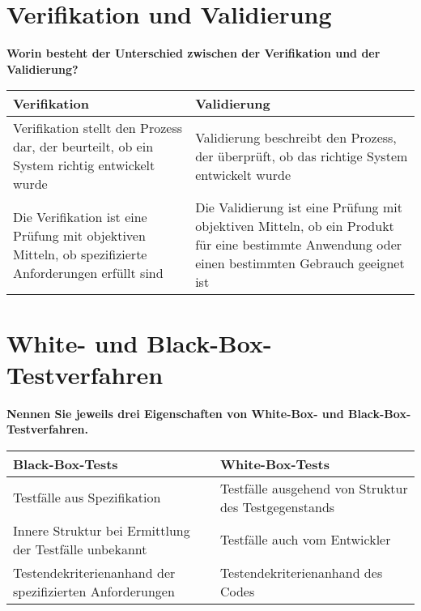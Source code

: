 \section{Verifikation und Validierung}
\textbf{Worin besteht der Unterschied zwischen der Verifikation und der Validierung?}
\begin{table}[H]
    \centering
    \begin{tabular}{p{.45\linewidth}p{.45\linewidth}}
        \toprule
        Verifikation                                                                                          & Validierung                                                                                                                                      \\
        \midrule
        Verifikation stellt den Prozess dar, der beurteilt, ob ein System richtig entwickelt wurde            & Validierung beschreibt den Prozess, der überprüft, ob das richtige System entwickelt wurde                                                       \\
        Die Verifikation ist eine Prüfung mit objektiven Mitteln, ob spezifizierte Anforderungen erfüllt sind & Die Validierung ist eine Prüfung mit objektiven Mitteln, ob ein Produkt für eine bestimmte Anwendung oder einen bestimmten Gebrauch geeignet ist \\
        \bottomrule
    \end{tabular}
\end{table}

\section{White- und Black-Box-Testverfahren}
\textbf{Nennen Sie jeweils drei Eigenschaften von White-Box- und Black-Box-Testverfahren.}
\begin{table}[H]
    \centering
    \begin{tabular}{p{.45\linewidth}p{.45\linewidth}}
        \toprule
        Black-Box-Tests                                          & White-Box-Tests                                      \\
        \midrule
        Testfälle aus Spezifikation                              & Testfälle ausgehend von Struktur des Testgegenstands \\
        Innere Struktur bei Ermittlung der Testfälle unbekannt   & Testfälle auch vom Entwickler                        \\
        Testendekriterienanhand der spezifizierten Anforderungen & Testendekriterienanhand des Codes                    \\
        \bottomrule
    \end{tabular}
\end{table}





